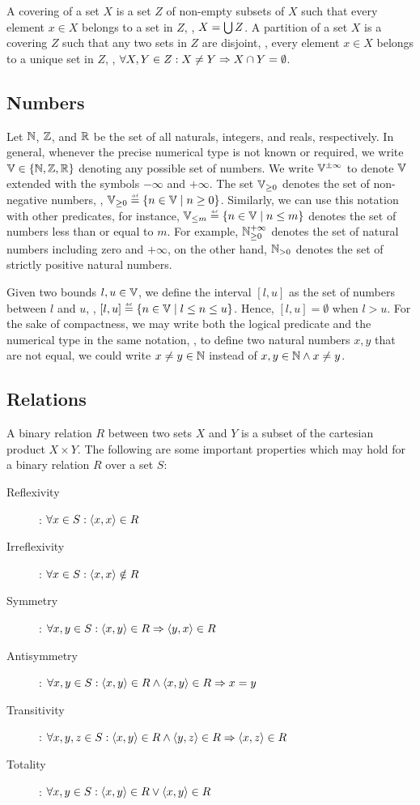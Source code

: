 A covering of a set $X$ is a set $Z$ of non-empty subsets of $X$ such that every element $x \in X$ belongs to a set in $Z$, \ie, $X = \bigcup Z$. A partition of a set $X$ is a covering $Z$ such that any two sets in $Z$ are disjoint, \ie, every element $x \in X$ belongs to a unique set in $Z$, \ie, $\forall X, Y \in Z : X \neq Y \Rightarrow X \cap Y = \emptyset$.


\subsection{Numbers}

Let $\mathbb{N}$, $\mathbb{Z}$, and $\mathbb{R}$ be the set of all naturals, integers, and reals, respectively.
In general, whenever the precise numerical type is not known or required, we write $\mathbb{V}\in\{\mathbb{N}, \mathbb{Z}, \mathbb{R}\}$ denoting any possible set of numbers.
We write $\mathbb{V}^{\pm \infty}$ to denote $\mathbb{V}$ extended with the symbols $-\infty$ and $+\infty$.
The set $\mathbb{V}_{\ge 0}$ denotes the set of non-negative numbers, \ie, $\values_{\ge 0} \defeq \setdef{n \in \values}{n \geq 0}$.
Similarly, we can use this notation with other predicates, for instance, $\values_{\le m} \defeq \setdef{n \in \values}{n \le m}$ denotes the set of numbers less than or equal to $m$.
For example, $\mathbb{N}_{\ge 0}^{+\infty}$ denotes the set of natural numbers including zero and $+\infty$, on the other hand, $\mathbb{N}_{> 0}$ denotes the set of strictly positive natural numbers.

Given two bounds $l, u \in \mathbb{V}$, we define the interval $[l, u]$ as the set of numbers between $l$ and $u$, \ie, $[l, u] \defeq \setdef{n \in \values}{l \le n \le u}$. Hence, $[l, u] = \emptyset$ when $l > u$.
For the sake of compactness, we may write both the logical predicate and the numerical type in the same notation, \eg, to define two natural numbers $x, y$ that are not equal, we could write $x \neq y \in \mathbb{N}$ instead of $x, y \in \mathbb{N} \land x \neq y$.


\subsection{Relations}
A binary relation $R$ between two sets $X$ and $Y$ is a subset of the cartesian product $X \times Y$.
The following are some important properties which may hold for a binary relation $R$ over a set $S$:
\begin{description}
    \item[Reflexivity]: $\forall x \in S : \langle x, x \rangle \in R$
    \item[Irreflexivity]: $\forall x \in S : \langle x, x \rangle \notin R$
    \item[Symmetry]: $\forall x, y \in S : \langle x, y \rangle \in R \Rightarrow \langle y, x \rangle \in R$
    \item[Antisymmetry]: $\forall x, y \in S : \langle x, y \rangle \in R \wedge \langle x, y \rangle \in R \Rightarrow x = y$
    \item[Transitivity]: $\forall x, y, z \in S : \langle x, y \rangle \in R \wedge \langle y, z \rangle \in R \Rightarrow \langle x, z \rangle \in R$
    \item[Totality]: $\forall x, y \in S : \langle x, y \rangle \in R \vee \langle x, y \rangle \in R$
\end{description}

